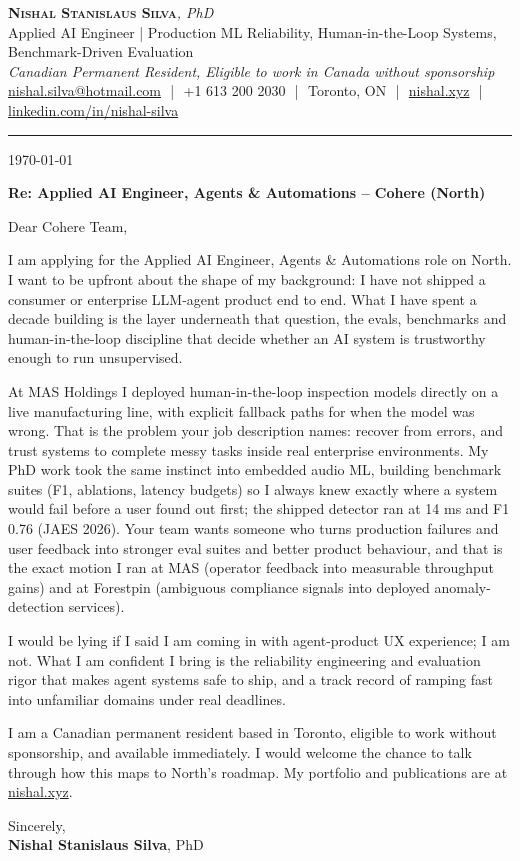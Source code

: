 \documentclass[11pt]{article}
\newcommand{\clName}{Nishal Stanislaus Silva}
\newcommand{\clStatus}{Canadian Permanent Resident, Eligible to work in Canada without sponsorship}
\newcommand{\clTagline}{Applied AI Engineer | Production ML Reliability, Human-in-the-Loop Systems, Benchmark-Driven Evaluation}
\newcommand{\clRole}{Applied AI Engineer, Agents \& Automations}
\newcommand{\clCompany}{Cohere}
\newcommand{\clTeam}{North}
\begin{document}
\pagestyle{empty}
\begin{center}
    {\LARGE \scshape \textbf{\clName}}{\large \textit{, PhD}}
    \\[1pt]
    {\small \clTagline}
    \\[1pt]
    {\footnotesize\textit{\clStatus}}
    \\[1pt]
    {\small
    \href{mailto:nishal.silva@hotmail.com}{nishal.silva@hotmail.com}
    \,\,|\,\, +1 613 200 2030
    \,\,|\,\, Toronto, ON
    \,\,|\,\, \href{https://nishal.xyz}{nishal.xyz}
    \,\,|\,\, \href{https://www.linkedin.com/in/nishal-silva}{linkedin.com/in/nishal-silva}}
\end{center}

\rule{\linewidth}{0.4pt}\vspace{0.6em}

\today

\textbf{Re: \clRole{} -- \clCompany{} (\clTeam{})}

Dear Cohere Team,

I am applying for the \clRole{} role on \clTeam{}. I want to be upfront about the shape of my background: I have not shipped a consumer or enterprise LLM-agent product end to end. What I have spent a decade building is the layer underneath that question, the evals, benchmarks and human-in-the-loop discipline that decide whether an AI system is trustworthy enough to run unsupervised.

At MAS Holdings I deployed human-in-the-loop inspection models directly on a live manufacturing line, with explicit fallback paths for when the model was wrong. That is the problem your job description names: recover from errors, and trust systems to complete messy tasks inside real enterprise environments. My PhD work took the same instinct into embedded audio ML, building benchmark suites (F1, ablations, latency budgets) so I always knew exactly where a system would fail before a user found out first; the shipped detector ran at 14 ms and F1 0.76 (JAES 2026). Your team wants someone who turns production failures and user feedback into stronger eval suites and better product behaviour, and that is the exact motion I ran at MAS (operator feedback into measurable throughput gains) and at Forestpin (ambiguous compliance signals into deployed anomaly-detection services).

I would be lying if I said I am coming in with agent-product UX experience; I am not. What I am confident I bring is the reliability engineering and evaluation rigor that makes agent systems safe to ship, and a track record of ramping fast into unfamiliar domains under real deadlines.

I am a Canadian permanent resident based in Toronto, eligible to work without sponsorship, and available immediately. I would welcome the chance to talk through how this maps to \clTeam{}'s roadmap. My portfolio and publications are at \href{https://nishal.xyz}{nishal.xyz}.

\vspace{12pt}
Sincerely,\\[2pt]
\textbf{\clName}, PhD
\end{document}
